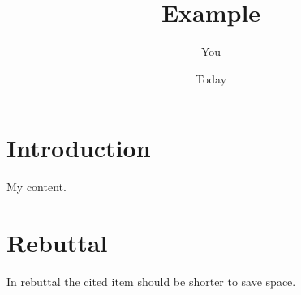 \documentclass{article}
\title{Example}
\author{You}
\date{Today}
\begin{document}
\maketitle

\section{Introduction}
My content. \cite{dummy_for_main}

\section{Rebuttal}
In rebuttal the cited item should be shorter to save space. \cite{dummy_for_rebuttal}



\end{document}
